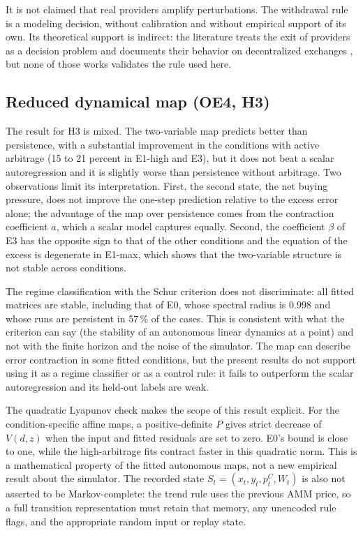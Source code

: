 It is not claimed that real providers amplify perturbations. The withdrawal rule is a modeling decision, without calibration and without empirical support of its own. Its theoretical support is indirect: the literature treats the exit of providers as a decision problem \cite{bergault2025exit} and documents their behavior on decentralized exchanges \cite{lehar2025uniswap}, but none of those works validates the rule used here.

\subsection{Reduced dynamical map (OE4, H3)}

The result for H3 is mixed. The two-variable map predicts better than persistence, with a substantial improvement in the conditions with active arbitrage (15 to 21 percent in E1-high and E3), but it does not beat a scalar autoregression and it is slightly worse than persistence without arbitrage. Two observations limit its interpretation. First, the second state, the net buying pressure, does not improve the one-step prediction relative to the excess error alone; the advantage of the map over persistence comes from the contraction coefficient $a$, which a scalar model captures equally. Second, the coefficient $\beta$ of E3 has the opposite sign to that of the other conditions and the equation of the excess is degenerate in E1-max, which shows that the two-variable structure is not stable across conditions.

The regime classification with the Schur criterion does not discriminate: all fitted matrices are stable, including that of E0, whose spectral radius is $0.998$ and whose runs are persistent in $57\,\%$ of the cases. This is consistent with what the criterion can say (the stability of an autonomous linear dynamics at a point) and not with the finite horizon and the noise of the simulator. The map can describe error contraction in some fitted conditions, but the present results do not support using it as a regime classifier or as a control rule: it fails to outperform the scalar autoregression and its held-out labels are weak.

The quadratic Lyapunov check makes the scope of this result explicit. For the condition-specific affine maps, a positive-definite $P$ gives strict decrease of $V(d,z)$ when the input and fitted residuals are set to zero. E0's bound is close to one, while the high-arbitrage fits contract faster in this quadratic norm. This is a mathematical property of the fitted autonomous maps, not a new empirical result about the simulator. The recorded state $S_t=(x_t,y_t,p_t^C,W_t)$ is also not asserted to be Markov-complete: the trend rule uses the previous AMM price, so a full transition representation must retain that memory, any unencoded rule flags, and the appropriate random input or replay state.

